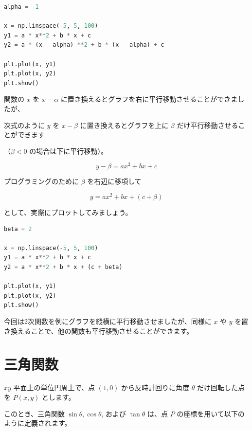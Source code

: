 \begin{lstlisting}[style=codecell,language=Python]
alpha = -1

x = np.linspace(-5, 5, 100)
y1 = a * x**2 + b * x + c
y2 = a * (x - alpha) **2 + b * (x - alpha) + c

plt.plot(x, y1)
plt.plot(x, y2)
plt.show()
\end{lstlisting}


関数の $x$ を $x - \alpha$ に置き換えるとグラフを右に平行移動させることができましたが、

次式のように $y$ を $x - \beta$ に置き換えるとグラフを上に $\beta$ だけ平行移動させることができます

（$\beta<0$ の場合は下に平行移動）。


\[
y - \beta = ax^2 + bx + c
\]


プログラミングのために $\beta$ を右辺に移項して

\[
y = ax^2 + bx + (c + \beta)
\]

として、実際にプロットしてみましょう。


\begin{lstlisting}[style=codecell,language=Python]
beta = 2

x = np.linspace(-5, 5, 100)
y1 = a * x**2 + b * x + c
y2 = a * x**2 + b * x + (c + beta)

plt.plot(x, y1)
plt.plot(x, y2)
plt.show()
\end{lstlisting}


今回は2次関数を例にグラフを縦横に平行移動させましたが、同様に $x$ や $y$ を置き換えることで、他の関数も平行移動させることができます。


\section{三角関数}


$xy$ 平面上の単位円周上で、点 $(1, 0)$ から反時計回りに角度 $\theta$ だけ回転した点を $P (x, y)$ とします。

このとき、三角関数 $\sin{\theta}, \cos{\theta}$, および $\tan{\theta}$ は、点 $P$ の座標を用いて以下のように定義されます。


